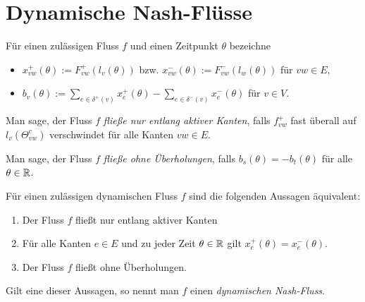 \section{Dynamische Nash-Flüsse}

\begin{frame}
	
	\begin{definition}
		Für einen zulässigen Fluss $f$ und einen Zeitpunkt $\theta$ bezeichne
		\begin{itemize}[label=\color{darkblue}$\bullet$]
			\item $x_{vw}^+(\theta):= F_{vw}^+(l_v(\theta))$ bzw. $x_{vw}^-(\theta):= F^-_{vw}(l_w(\theta))$ für $vw\in E$,
			\item $b_v(\theta) := \sum_{e\in\delta^+(v)} x_e^+(\theta) - \sum_{e\in\delta^-(v)} x_e^-(\theta)$ für $v\in V$.
		\end{itemize}
	\end{definition}
	
	\begin{definition}\label{def-flow-along-active-edges}
		Man sage, der Fluss $f$ \emph{fließe nur entlang aktiver Kanten}, falls $f_{vw}^+$ fast überall auf $l_v(\Theta_{vw}^c)$ verschwindet für alle Kanten $vw\in E$.
	\end{definition}

	\begin{definition}
	Man sage, der Fluss $f$ \emph{fließe ohne Überholungen}, falls $b_s(\theta) = -b_t(\theta)$ für alle $\theta\in\mathbb{R}$.
	\end{definition}
\end{frame}

\begin{frame}
	\begin{theorem}\label{thm-equivalencies-nash-flow}
		Für einen zulässigen dynamischen Fluss $f$ sind die folgenden Aussagen äquivalent:
		\begin{enumerate}[label=(\roman*)]
			\item Der Fluss $f$ fließt nur entlang aktiver Kanten
			\item Für alle Kanten $e\in E$ und zu jeder Zeit $\theta\in\mathbb{R}$ gilt $x_e^+(\theta) = x_e^-(\theta)$.
			\item Der Fluss $f$ fließt ohne Überholungen.
		\end{enumerate}
		Gilt eine dieser Aussagen, so nennt man $f$ einen \emph{dynamischen Nash-Fluss}.
	\end{theorem}
\end{frame}